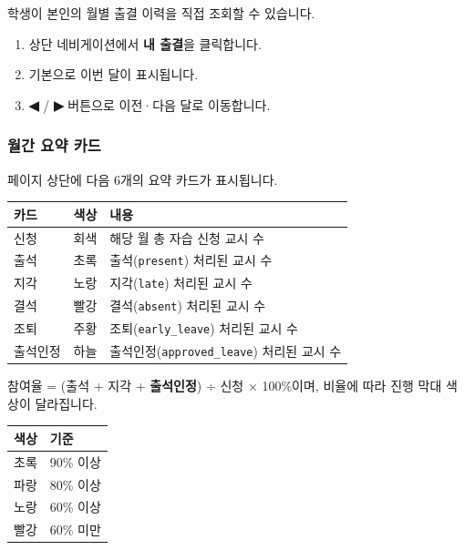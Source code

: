 \documentclass[a4paper,12pt]{article}
\newcommand{\menu}[1]{\textcolor{primary}{\textbf{#1}}}
\begin{document}
학생이 본인의 월별 출결 이력을 직접 조회할 수 있습니다.

\begin{enumerate}[leftmargin=1.5em]
    \item 상단 네비게이션에서 \menu{내 출결}을 클릭합니다.
    \item 기본으로 이번 달이 표시됩니다.
    \item \menu{◀} / \menu{▶} 버튼으로 이전·다음 달로 이동합니다.
\end{enumerate}

\subsubsection{월간 요약 카드}

페이지 상단에 다음 6개의 요약 카드가 표시됩니다.

\begin{center}
\begin{tabular}{lll}
\toprule
\textbf{카드} & \textbf{색상} & \textbf{내용} \\
\midrule
신청     & 회색  & 해당 월 총 자습 신청 교시 수 \\
출석     & 초록  & 출석(\texttt{present}) 처리된 교시 수 \\
지각     & 노랑  & 지각(\texttt{late}) 처리된 교시 수 \\
결석     & 빨강  & 결석(\texttt{absent}) 처리된 교시 수 \\
조퇴     & 주황  & 조퇴(\texttt{early\_leave}) 처리된 교시 수 \\
출석인정 & 하늘  & 출석인정(\texttt{approved\_leave}) 처리된 교시 수 \\
\bottomrule
\end{tabular}
\end{center}

참여율 = (출석 + 지각 + \textbf{출석인정}) ÷ 신청 × 100\%이며,
비율에 따라 진행 막대 색상이 달라집니다.

\begin{center}
\begin{tabular}{ll}
\toprule
\textbf{색상} & \textbf{기준} \\
\midrule
초록 & 90\% 이상 \\
파랑 & 80\% 이상 \\
노랑 & 60\% 이상 \\
빨강 & 60\% 미만 \\
\bottomrule
\end{tabular}
\end{center}
\end{document}
